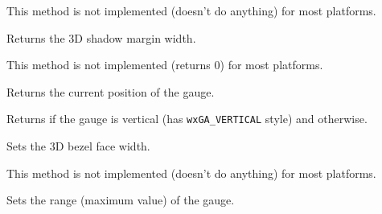 This method is not implemented (doesn't do anything) for most platforms.




\label{wxgaugegetshadowwidth}


Returns the 3D shadow margin width.


This method is not implemented (returns $0$) for most platforms.




\label{wxgaugegetvalue}


Returns the current position of the gauge.




\label{wxgaugeisvertical}


Returns \true if the gauge is vertical (has \texttt{wxGA\_VERTICAL} style) and 
\false otherwise.


\label{wxgaugesetbezelface}


Sets the 3D bezel face width.


This method is not implemented (doesn't do anything) for most platforms.




\label{wxgaugesetrange}


Sets the range (maximum value) of the gauge.




\label{wxgaugesetshadowwidth}


